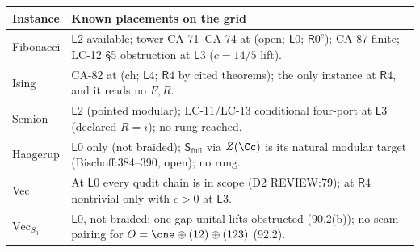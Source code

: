 \begin{center}\footnotesize
\begin{tabular}{p{2.0cm}p{12.0cm}}
\toprule
Instance & Known placements on the grid \\
\midrule
Fibonacci & \(\mathsf L2\) available; tower CA-71--CA-74 at (open; \(\mathsf L0\); \(\mathsf R0^c\)); CA-87 finite; LC-12 \S5 obstruction at \(\mathsf L3\) (\(c=14/5\) lift). \\
Ising & CA-82 at (ch; \(\mathsf L4\); \(\mathsf R4\) by cited theorems); the only instance at \(\mathsf R4\), and it reads no \(F,R\). \\
Semion & \(\mathsf L2\) (pointed modular); LC-11/LC-13 conditional four-port at \(\mathsf L3\) (declared \(R=i\)); no rung reached. \\
Haagerup & \(\mathsf L0\) only (not braided); \(\mathsf S_{\mathrm{full}}\) via \(Z(\Cc)\) is its natural modular target (Bischoff:384--390, open); no rung. \\
Vec & At \(\mathsf L0\) every qudit chain is in scope (D2 REVIEW:79); at \(\mathsf R4\) nontrivial only with \(c>0\) at \(\mathsf L3\). \\
\(\mathrm{Vec}_{S_3}\) & \(\mathsf L0\), not braided: one-gap unital lifts obstructed (90.2(b)); no seam pairing for \(O=\one\oplus(12)\oplus(123)\) (92.2). \\
\bottomrule
\end{tabular}
\end{center}
